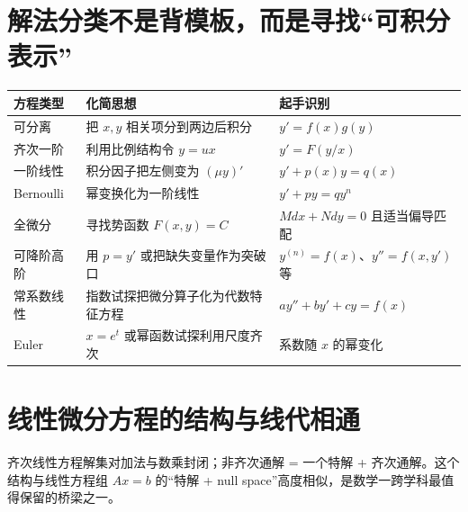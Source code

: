 \documentclass[11pt,a4paper,openany]{ctexbook}
\begin{document}
\section{解法分类不是背模板，而是寻找“可积分表示”}
\begin{longtable}{L{3.2cm}L{4.8cm}L{\dimexpr\linewidth-8.87cm\relax}}
\toprule\textbf{方程类型}&\textbf{化简思想}&\textbf{起手识别}\\\midrule
可分离 & 把 $x,y$ 相关项分到两边后积分 & $y'=f(x)g(y)$\\
齐次一阶 & 利用比例结构令 $y=ux$ & $y'=F(y/x)$\\
一阶线性 & 积分因子把左侧变为 $(\mu y)'$ & $y'+p(x)y=q(x)$\\
Bernoulli & 幂变换化为一阶线性 & $y'+py=qy^n$\\
全微分 & 寻找势函数 $F(x,y)=C$ & $Mdx+Ndy=0$ 且适当偏导匹配\\
可降阶高阶 & 用 $p=y'$ 或把缺失变量作为突破口 & $y^{(n)}=f(x)$、$y''=f(x,y')$ 等\\
常系数线性 & 指数试探把微分算子化为代数特征方程 & $ay''+by'+cy=f(x)$\\
Euler & $x=e^t$ 或幂函数试探利用尺度齐次 & 系数随 $x$ 的幂变化\\
\bottomrule\end{longtable}

\section{线性微分方程的结构与线代相通}
齐次线性方程解集对加法与数乘封闭；非齐次通解 = 一个特解 + 齐次通解。这个结构与线性方程组 $Ax=b$ 的“特解 + null space”高度相似，是数学一跨学科最值得保留的桥梁之一。
\end{document}
